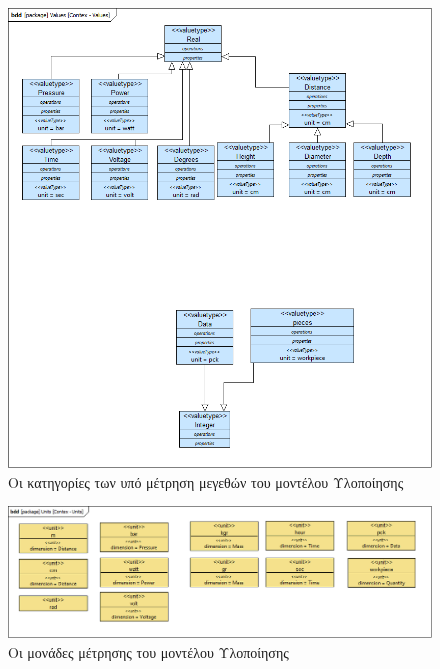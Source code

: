 \documentclass[a4paper,12pt,twoside]{report}
\begin{document}
\begin{appendices}
				\begin{figure}[hp]
					\centering
					\includegraphics[scale=0.50]{DesignModel_Contex-Values.png}
					\caption{Οι κατηγορίες των υπό μέτρηση μεγεθών του μοντέλου Υλοποίησης}
					\label{φωτ:Οι κατηγορίες των υπό μέτρηση μεγεθών του μοντέλου Υλοποίησης}
				\end{figure}
				
				\begin{figure}[hp]
					\centering
					\includegraphics[scale=0.30]{DesignModel_Contex-Units.png}
					\caption{Οι μονάδες μέτρησης του μοντέλου Υλοποίησης}
					\label{φωτ:Οι μονάδες μέτρησης του μοντέλου Υλοποίησης}
				\end{figure}
				

\end{appendices}
\end{document}

